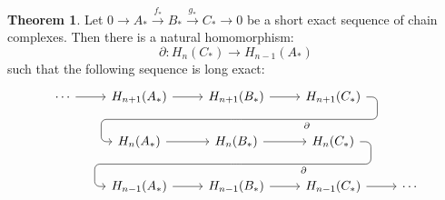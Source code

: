 \documentclass[11pt, oneside]{amsart}   	%
\theoremstyle{definition}
\newtheorem{theorem}{Theorem}[section]
\begin{document}
\begin{theorem}
	Let $0\rightarrow A_*\xrightarrow{f_*} B_*\xrightarrow{g_*} C_*\rightarrow 0$ be a short exact sequence of chain 
	complexes. Then there is a natural homomorphism:
	\begin{equation}
		\partial : H_n(C_*)\rightarrow H_{n - 1}(A_*)
	\end{equation}
	such that the following sequence is long exact:
	\begin{equation}\begin{tikzcd}
		\cdots\arrow[r] & H_{n + 1}(A_*)\arrow[r] & H_{n + 1}(B_*)\arrow[r] \arrow[d, phantom, ""{coordinate, name=Z}] & 
		H_{n + 1}(C_*) \arrow[dll, "\partial", rounded corners, 
		to path={ -- ([xshift=2ex]\tikztostart.east)
                |- (Z) [near end]\tikztonodes
                -| ([xshift=-2ex]\tikztotarget.west)
                -- (\tikztotarget)}] & \\
		& H_n(A_*)\arrow[r] & H_n(B_*)\arrow[r] \arrow[d, phantom, ""{coordinate, name=W}] & H_n(C_*) 
		\arrow[dll, "\partial", rounded corners, 
		to path={ -- ([xshift=2ex]\tikztostart.east)
                |- (W) [near end]\tikztonodes
                -| ([xshift=-2ex]\tikztotarget.west)
                -- (\tikztotarget)}] & \\
		 & H_{n - 1}(A_*)\arrow[r] & H_{n - 1}(B_*)\arrow[r] & H_{n - 1}(C_*)\arrow[r] & \cdots
	\end{tikzcd}\end{equation}
\end{theorem}
\end{document}
